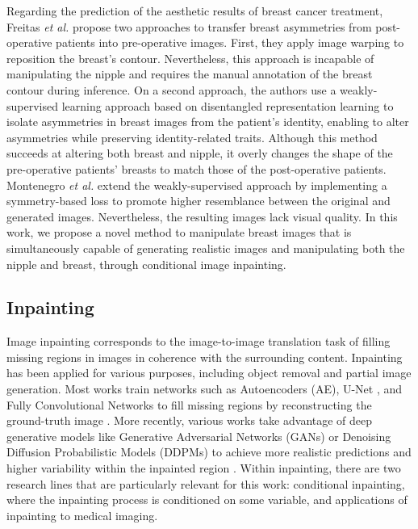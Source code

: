 Regarding the prediction of the aesthetic results of breast cancer treatment, Freitas \textit{et al.} \cite{freitas2024isbi} propose two approaches to transfer breast asymmetries from post-operative patients into pre-operative images. First, they apply image warping to reposition the breast's contour. Nevertheless, this approach is incapable of manipulating the nipple and requires the manual annotation of the breast contour during inference. On a second approach, the authors use a weakly-supervised learning approach based on disentangled representation learning to isolate asymmetries in breast images from the patient's identity, enabling to alter asymmetries while preserving identity-related traits. Although this method succeeds at altering both breast and nipple, it overly changes the shape of the pre-operative patients' breasts to match those of the post-operative patients. Montenegro \textit{et al.} \cite{montenegro2024aim} extend the weakly-supervised approach by implementing a symmetry-based loss to promote higher resemblance between the original and generated images. Nevertheless, the resulting images lack visual quality. In this work, we propose a novel method to manipulate breast images that is simultaneously capable of generating realistic images and manipulating both the nipple and breast, through conditional image inpainting. 

\subsection{Inpainting}

Image inpainting corresponds to the image-to-image translation task of filling missing regions in images in coherence with the surrounding content. Inpainting has been applied for various purposes, including object removal and partial image generation. Most works train networks such as Autoencoders (AE), U-Net \cite{ronneberger2015u}, and Fully Convolutional Networks \cite{long2015fully} to fill missing regions by reconstructing the ground-truth image \cite{liu2018image, xiang2023deep}. More recently, various works take advantage of deep generative models like Generative Adversarial Networks (GANs) \cite{goodfellow2014gans} or Denoising Diffusion Probabilistic Models (DDPMs) \cite{ho2020denoising} to achieve more realistic predictions and higher variability within the inpainted region \cite{zeng2021cr, pathak2016context, lim2023image, corneanu2024latentpaint}. Within inpainting, there are two research lines that are particularly relevant for this work: conditional inpainting, where the inpainting process is conditioned on some variable, and applications of inpainting to medical imaging. 

